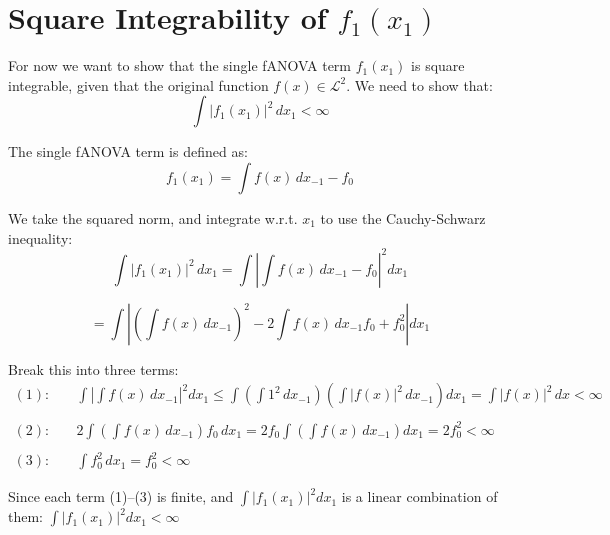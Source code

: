 \section*{Square Integrability of \( f_1(x_1) \)}

For now we want to show that the single fANOVA term \( f_1(x_1) \) is square integrable, given that the original function $f(x) \in \mathcal{L}^2$. We need to show that:
\[
\int |f_1(x_1)|^2 \, dx_1 < \infty
\]

The single fANOVA term is defined as:
\[
f_1(x_1) = \int f(x) \, dx_{-1} - f_0
\]

We take the squared norm, and integrate w.r.t. \( x_1 \) to use the Cauchy-Schwarz inequality:
\[
\int |f_1(x_1)|^2 \, dx_1 
= \int \left| \int f(x) \, dx_{-1} - f_0 \right|^2 dx_1
\]

\[
= \int | (\int f(x) \, dx_{-1})^2 
- 2 \int f(x) \, dx_{-1} f_0 
+ f_0^2 | dx_1
\]

Break this into three terms:
\begin{align*}
(1): &\quad \int \left| \int f(x) \, dx_{-1} \right|^2 dx_1 
\leq \int \left( \int 1^2 \, dx_{-1} \right) \left( \int |f(x)|^2 \, dx_{-1} \right) dx_1 
= \int |f(x)|^2 \, dx < \infty \\
\\
(2): &\quad 2 \int \left( \int f(x) \, dx_{-1} \right) f_0 \, dx_1 
= 2 f_0 \int \left( \int f(x) \, dx_{-1} \right) dx_1 
= 2 f_0^2 < \infty \\
\\
(3): &\quad \int f_0^2 \, dx_1 = f_0^2 < \infty
\end{align*}

Since each term (1)–(3) is finite, and \( \int |f_1(x_1)|^2 dx_1 \) is a linear combination of them: \(\int |f_1(x_1)|^2 dx_1 < \infty\)




